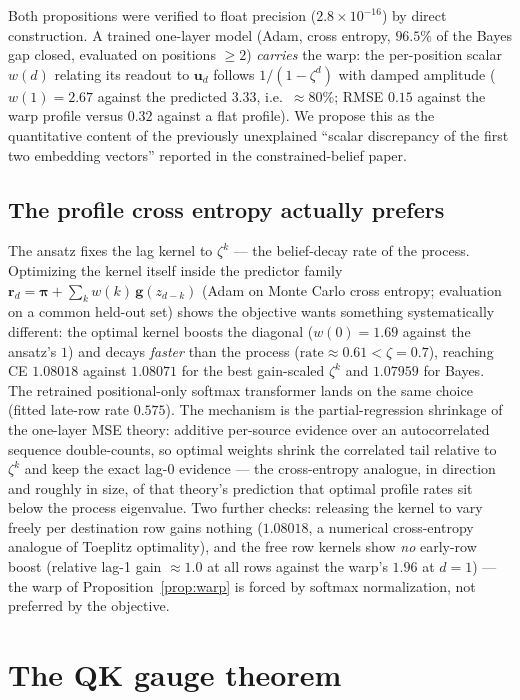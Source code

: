 \documentclass{article}
\newcommand{\gb}{\boldsymbol{g}}
\newcommand{\ub}{\boldsymbol{u}}
\newcommand{\rb}{\boldsymbol{r}}
\newcommand{\pib}{\boldsymbol{\pi}}
\theoremstyle{definition}
\begin{document}
Both propositions were verified to float precision ($2.8\times10^{-16}$) by
direct construction. A trained one-layer model (Adam, cross entropy, $96.5\%$
of the Bayes gap closed, evaluated on positions $\ge 2$) \emph{carries} the warp: the per-position scalar
$w(d)$ relating its readout to $\ub_d$ follows $1/(1-\zeta^d)$ with damped
amplitude ($w(1) = 2.67$ against the predicted $3.33$, i.e.\ $\approx 80\%$;
RMSE $0.15$ against the warp profile
versus $0.32$ against a flat profile). We propose this as the quantitative
content of the previously unexplained ``scalar discrepancy of the first two
embedding vectors'' reported in the constrained-belief paper.

\subsection{The profile cross entropy actually prefers}

The ansatz fixes the lag kernel to $\zeta^k$ --- the belief-decay rate of
the process. Optimizing the kernel itself inside the predictor family
$\rb_d = \pib + \sum_k w(k)\, \gb(z_{d-k})$ (Adam on Monte Carlo cross
entropy; evaluation on a common held-out set) shows the objective wants
something systematically different: the optimal kernel boosts the diagonal
($w(0) = 1.69$ against the ansatz's $1$) and decays \emph{faster} than the
process ($\text{rate} \approx 0.61 < \zeta = 0.7$), reaching CE $1.08018$
against $1.08071$ for the best gain-scaled $\zeta^k$ and $1.07959$ for
Bayes. The retrained positional-only softmax transformer lands on the same
choice (fitted late-row rate $0.575$). The mechanism is the
partial-regression shrinkage of the one-layer MSE theory: additive
per-source evidence over an autocorrelated sequence double-counts, so
optimal weights shrink the correlated tail relative to $\zeta^k$ and keep
the exact lag-$0$ evidence --- the cross-entropy analogue, in direction and
roughly in size, of that theory's prediction that optimal profile rates sit
below the process eigenvalue. Two further checks: releasing the kernel to
vary freely per destination row gains nothing ($1.08018$, a numerical
cross-entropy analogue of Toeplitz optimality), and the free row kernels
show \emph{no} early-row boost (relative lag-1 gain $\approx 1.0$ at all
rows against the warp's $1.96$ at $d=1$) --- the warp of
Proposition~\ref{prop:warp} is forced by softmax normalization, not
preferred by the objective.

\section{The QK gauge theorem}
\end{document}
